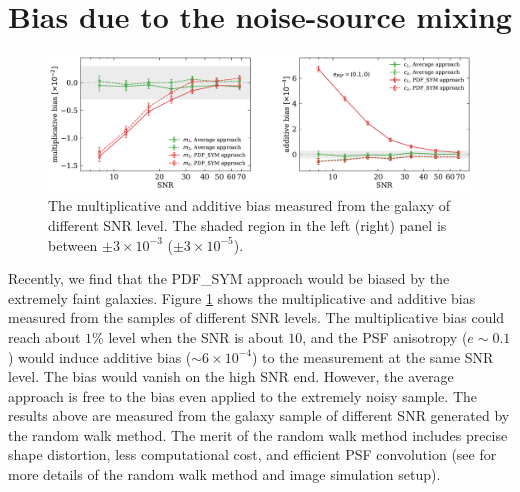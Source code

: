 \documentclass[twocolumn]{aastex62}
\begin{document}
\section{Bias due to the noise-source mixing}\label{sec:bias_cal}

\begin{figure}[htbp]
	\centering
	\includegraphics[width=0.9\linewidth]{figures/pts_sample_mc.pdf}
	\caption{The multiplicative and additive bias measured from the galaxy of different SNR level. The shaded region in the left (right) panel is between $\pm 3\times 10^{-3}$ ($\pm 3\times10^{-5}$). }\label{fig:pts_mc}
\end{figure}

Recently, we find that the PDF\_SYM approach would be biased by the extremely faint galaxies. Figure \ref{fig:pts_mc} shows the multiplicative and additive bias measured from the samples of different SNR levels. The multiplicative bias could reach about $1\%$ level when the SNR is about $10$, and the PSF anisotropy ($e \sim 0.1$) would induce additive bias ($\sim 6\times 10^{-4}$) to the measurement at the same SNR level. The bias would vanish on the high SNR end. However, the average approach is free to the bias even applied to the extremely noisy sample. The results above are measured from the galaxy sample of different SNR generated by the random walk method. The merit of the random walk method includes precise shape distortion, less computational cost, and efficient PSF convolution (see \cite{Li2020} for more details of the random walk method and image simulation setup).
\end{document}

